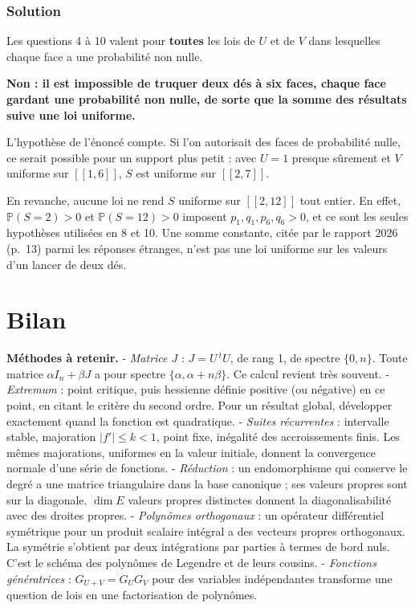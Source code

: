 \documentclass[11pt,a4paper]{article}
\begin{document}
\hypertarget{solution-46}{%
\subsubsection{Solution}\label{solution-46}}

Les questions 4 à 10 valent pour \textbf{toutes} les lois de \(U\) et de \(V\) dans lesquelles chaque face a une probabilité non nulle.

\textbf{Non : il est impossible de truquer deux dés à six faces, chaque face gardant une probabilité non nulle, de sorte que la somme des résultats suive une loi uniforme.}

\begin{piege}

L'hypothèse de l'énoncé compte. Si l'on autorisait des faces de probabilité nulle, ce serait possible pour un support plus petit : avec \(U=1\) presque sûrement et \(V\) uniforme sur \([\![1,6]\!]\), \(S\) est uniforme sur \([\![2,7]\!]\).

En revanche, aucune loi ne rend \(S\) uniforme sur \([\![2,12]\!]\) tout entier. En effet, \(\mathbb P(S=2)>0\) et \(\mathbb P(S=12)>0\) imposent \(p_1,q_1,p_6,q_6>0\), et ce sont les seules hypothèses utilisées en 8 et 10. Une somme constante, citée par le rapport 2026 (p.~13) parmi les réponses étranges, n'est pas une loi uniforme sur les valeurs d'un lancer de deux dés.

\end{piege}

\hypertarget{bilan}{%
\section{Bilan}\label{bilan}}

\textbf{Méthodes à retenir.}
- \emph{Matrice \(J\)} : \(J=U\,{}^tU\), de rang 1, de spectre \(\{0,n\}\). Toute matrice \(\alpha I_n+\beta J\) a pour spectre \(\{\alpha,\alpha+n\beta\}\). Ce calcul revient très souvent.
- \emph{Extremum} : point critique, puis hessienne définie positive (ou négative) en ce point, en citant le critère du second ordre. Pour un résultat global, développer exactement quand la fonction est quadratique.
- \emph{Suites récurrentes} : intervalle stable, majoration \(|f'|\le k<1\), point fixe, inégalité des accroissements finis. Les mêmes majorations, uniformes en la valeur initiale, donnent la convergence normale d'une série de fonctions.
- \emph{Réduction} : un endomorphisme qui conserve le degré a une matrice triangulaire dans la base canonique ; ses valeurs propres sont sur la diagonale. \(\dim E\) valeurs propres distinctes donnent la diagonalisabilité avec des droites propres.
- \emph{Polynômes orthogonaux} : un opérateur différentiel symétrique pour un produit scalaire intégral a des vecteurs propres orthogonaux. La symétrie s'obtient par deux intégrations par parties à termes de bord nuls. C'est le schéma des polynômes de Legendre et de leurs cousins.
- \emph{Fonctions génératrices} : \(G_{U+V}=G_UG_V\) pour des variables indépendantes transforme une question de lois en une factorisation de polynômes.
\end{document}
